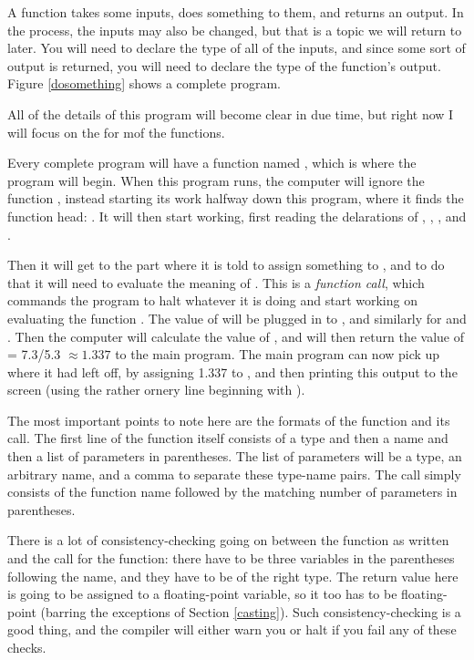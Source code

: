 \documentclass[12pt]{article}
\makeatletter
\def\ttind#1{\index{#1@\cinline{#1}}\cinline{#1}}
\makeatother
\begin{document}
A function takes some inputs, does something to them, and returns an
output. In the process, the inputs may also be changed, but that is a
topic we will return to later.  You will need to declare the type of all of
the inputs, and since some sort of output is returned, you will need to
declare the type of the function's output. Figure \ref{dosomething} shows a complete program.


All of the details of this program will become clear in due time, but
right now I will focus on the for mof the functions.

Every complete program will have a function named \ttind{main}, which
is where the program will begin.  When this program runs, the computer will
ignore the function , instead starting its work halfway
down this program, where it finds the  function head: . 
It will then start working, first reading the
delarations of , , , and .

Then it will get to the part where it is told to assign something to
, and to do that it will need to evaluate  the meaning of
. This is a {\em function call}, which commands the program to
halt whatever it is doing and start working on evaluating the function .
The value of  will
be plugged in to , and similarly for  and . Then
the computer will calculate the value of , and
will then return the value of  = 7.3/5.3 $\approx 1.337$ to the
main program. The main program can now pick up where it had left off,
by assigning 1.337 to , and then printing this output to the
screen (using the rather ornery line beginning with ).

The most important points to note here are the formats of the function
and its call. The first line of the function itself consists of a type
and then a name and then a list of parameters in parentheses. 
The list of parameters will be a type, an arbitrary name, and a comma
to separate these type-name pairs.  The call simply consists of the
function name followed by the matching number of parameters in parentheses.

There is a lot of consistency-checking going on between the function as written
and the call for the function: there have to be three variables in the parentheses following the name,
and they have to be of the right type. The return value here is going to be assigned to a floating-point
variable, so it too has to be floating-point (barring the exceptions of Section \ref{casting}). Such
consistency-checking is a good thing, and the compiler will either warn you or halt if you fail any
of these checks.
\end{document}
